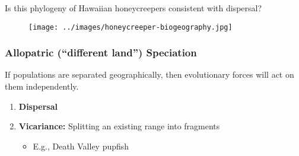 \documentclass[14pt,table]{beamer}
\begin{document}
\begin{frame}[t]
    \begin{adjustwidth}{-1.5em}{-1.5em}
    {\small Is this phylogeny of Hawaiian honeycreepers consistent with dispersal?}
        \begin{figure}
            \begin{center}
                \texttt{[image: ../images/honeycreeper-biogeography.jpg]}
                \caption{}
            \end{center}
        \end{figure}
    \end{adjustwidth}
\end{frame}


\begin{frame}[t]
    \frametitle{Allopatric (``different land'') Speciation}
    \vspace{-4mm}
    \begin{adjustwidth}{-1.5em}{-1.5em}
        If populations are separated geographically, then evolutionary forces
        will act on them independently.
        \begin{enumerate}
            \item \textbf{Dispersal}
            \item \textbf{Vicariance:} Splitting an existing range into fragments
                \begin{itemize}
                    \item E.g., Death Valley pupfish
                \end{itemize}
        \end{enumerate}
    \end{adjustwidth}

\end{frame}
\end{document}
